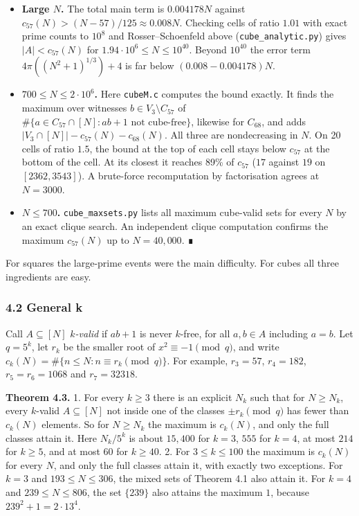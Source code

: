 \documentclass[
  11pt,
]{article}
\providecommand{\tightlist}{%
  \setlength{\itemsep}{0pt}\setlength{\parskip}{0pt}}
\begin{document}
\begin{itemize}
\tightlist
\item
  \textbf{Large \(N\).} The total main term is \(0.004178N\) against
  \(c_{57}(N) > (N - 57)/125 \approx 0.008N\). Checking cells of ratio
  \(1.01\) with exact prime counts to \(10^{8}\) and Rosser--Schoenfeld
  above (\texttt{cube\_analytic.py}) gives \(|A| < c_{57}(N)\) for
  \(1.94\cdot 10^{6} \le N \le 10^{40}\). Beyond \(10^{40}\) the error
  term \(4\pi((N^2 + 1)^{1/3}) + 4\) is far below
  \((0.008 - 0.004178)N\).
\item
  \textbf{\(700 \le N \le 2\cdot 10^{6}\).} Here \texttt{cubeM.c}
  computes the bound exactly. It finds the maximum over witnesses
  \(b \in V_3 \setminus C_{57}\) of
  \(\#\{a \in C_{57} \cap [N] : ab + 1 \text{ not cube-free}\}\),
  likewise for \(C_{68}\), and adds
  \(|V_3 \cap [N]| - c_{57}(N) - c_{68}(N)\). All three are
  nondecreasing in \(N\). On 20 cells of ratio \(1.5\), the bound at the
  top of each cell stays below \(c_{57}\) at the bottom of the cell. At
  its closest it reaches 89\% of \(c_{57}\) (\(17\) against \(19\) on
  \([2362, 3543]\)). A brute-force recomputation by factorisation agrees
  at \(N = 3000\).
\item
  \textbf{\(N \le 700\).} \texttt{cube\_maxsets.py} lists all maximum
  cube-valid sets for every \(N\) by an exact clique search. An
  independent clique computation confirms the maximum \(c_{57}(N)\) up
  to \(N = 40{,}000\). ∎
\end{itemize}

For squares the large-prime events were the main difficulty. For cubes
all three ingredients are easy.

\subsubsection{4.2 General k}

Call \(A \subseteq [N]\) \emph{\(k\)-valid} if \(ab + 1\) is never
\(k\)-free, for all \(a, b \in A\) including \(a = b\). Let \(q = 5^k\),
let \(r_k\) be the smaller root of \(x^2 \equiv -1 \pmod{q}\), and write
\(c_k(N) = \#\{n \le N : n \equiv r_k \pmod{q}\}\). For example,
\(r_3 = 57\), \(r_4 = 182\), \(r_5 = r_6 = 1068\) and \(r_7 = 32318\).

\textbf{Theorem 4.3.} 1. For every \(k \ge 3\) there is an explicit
\(N_k\) such that for \(N \ge N_k\), every \(k\)-valid
\(A \subseteq [N]\) not inside one of the classes \(\pm r_k \pmod{q}\)
has fewer than \(c_k(N)\) elements. So for \(N \ge N_k\) the maximum is
\(c_k(N)\), and only the full classes attain it. Here \(N_k/5^k\) is
about \(15{,}400\) for \(k = 3\), \(555\) for \(k = 4\), at most \(214\)
for \(k \ge 5\), and at most \(60\) for \(k \ge 40\). 2. For
\(3 \le k \le 100\) the maximum is \(c_k(N)\) for every \(N\), and only
the full classes attain it, with exactly two exceptions. For \(k = 3\)
and \(193 \le N \le 306\), the mixed sets of Theorem 4.1 also attain it.
For \(k = 4\) and \(239 \le N \le 806\), the set \(\{239\}\) also
attains the maximum \(1\), because \(239^2 + 1 = 2\cdot 13^{4}\).
\end{document}
